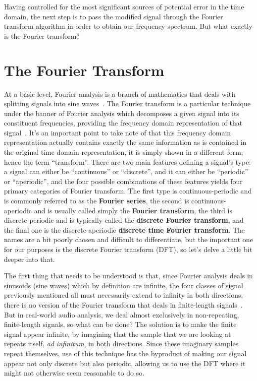 \documentclass[12pt]{report}
\begin{document}
\indent Having controlled for the most significant sources of potential error in the time domain, the next step is to pass the modified signal through the Fourier transform algorithm in order to obtain our frequency spectrum. But what exactly is the Fourier transform?


\section{The Fourier Transform}
\indent At a basic level, Fourier analysis is a branch of mathematics that deals with splitting signals into sine waves~\cite[ch. 8]{Smith1998}. The Fourier transform is a particular technique under the banner of Fourier analysis which decomposes a given signal into its constituent frequencies, providing the frequency domain representation of that signal~\cite[ch.8.1]{Smith1998}. It's an important point to take note of that this frequency domain representation actually contains exactly the same information as is contained in the original time domain representation, it is simply shown in a different form; hence the term ``transform''. There are two main features defining a signal's type: a signal can either be ``continuous'' or ``discrete'', and it can either be ``periodic'' or ``aperiodic'', and the four possible combinations of these features yields four primary categories of Fourier transform. The first type is continuous-periodic and is commonly referred to as the {\bf Fourier series}, the second is continuous-aperiodic and is usually called simply the {\bf Fourier transform}, the third is discrete-periodic and is typically called the {\bf discrete Fourier transform}, and the final one is the discrete-aperiodic {\bf discrete time Fourier transform}. The names are a bit poorly chosen and difficult to differentiate, but the important one for our purposes is the discrete Fourier transform (DFT), so let's delve a little bit deeper into that.

\indent The first thing that needs to be understood is that, since Fourier analysis deals in sinusoids (sine waves) which by definition are infinite, the four classes of signal previously mentioned all must necessarily extend to infinity in both directions; there is no version of the Fourier transform that deals in finite-length signals~\cite[ch.8.1]{Smith1998}. But in real-world audio analysis, we deal almost exclusively in non-repeating, finite-length signals, so what can be done? The solution is to make the finite signal appear infinite, by imagining that the sample that we are looking at repeats itself, \emph{ad infinitum}, in both directions. Since these imaginary samples repeat themselves, use of this technique has the byproduct of making our signal appear not only discrete but also periodic, allowing us to use the DFT where it might not otherwise seem reasonable to do so. 
\end{document}
